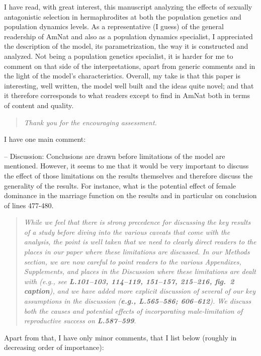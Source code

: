 \documentclass[11pt]{article}
\begin{document}
I have read, with great interest, this manuscript analyzing the effects of sexually antagonistic selection in hermaphrodites at both the population genetics and population dynamics levels. As a representative (I guess) of the general readership of AmNat and also as a population dynamics specialist, I appreciated the description of the model, its parametrization, the way it is constructed and analyzed. Not being a population genetics specialist, it is harder for me to comment on that side of the interpretations, apart from generic comments and in the light of the model’s characteristics. Overall, my take is that this paper is interesting, well written, the model well built and the ideas quite novel; and that it therefore corresponds to what readers except to find in AmNat both in terms of content and quality.

\begin{quote}
	{\itshape Thank you for the encouraging assessment.}
\end{quote}

\noindent I have one main comment:

\noindent-- Discussion: Conclusions are drawn before limitations of the model are mentioned. However, it seems to me that it would be very important to discuss the effect of those limitations on the results themselves and therefore discuss the generality of the results. For instance, what is the potential effect of female dominance in the marriage function on the results and in particular on conclusion of lines 477-480.

\begin{quote}
	{\itshape While we feel that there is strong precedence for discussing the key results of a study before diving into the various caveats that come with the analysis, the point is well taken that we need to clearly direct readers to the places in our paper where these limitations are discussed. In our Methods section, we are now careful to point readers to the various Appendixes, Supplements, and places in the Discussion where these limitations are dealt with (e.g., see {\bf L.101--103, 114--119, 151--157, 215--216, fig.~2 caption}), and we have added more explicit discussion of several of our key assumptions in the discussion ({\bf e.g., L.565--586; 606--612}). We discuss both the causes and potential effects of incorporating male-limitation of reproductive success on {\bf L.587--599}}.
\end{quote}

\noindent Apart from that, I have only minor comments, that I list below (roughly in decreasing order of importance):
\bigskip 
\end{document}
